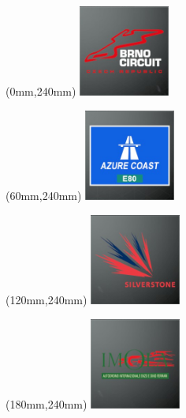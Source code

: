 \begin{textblock*}{30mm}(0mm,240mm)%
\includegraphics[width=30mm]{LG/2015-05-20_00075.png}
\end{textblock*}
\begin{textblock*}{30mm}(60mm,240mm)%
\includegraphics[width=30mm]{LG/2015-05-20_00073.png}
\end{textblock*}
\begin{textblock*}{30mm}(120mm,240mm)%
\includegraphics[width=30mm]{LG/2015-05-20_00094.png}
\end{textblock*}
\begin{textblock*}{30mm}(180mm,240mm)%
\includegraphics[width=30mm]{LG/2015-05-20_00083.png}
\end{textblock*}
